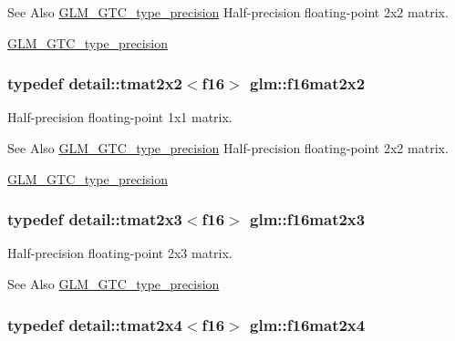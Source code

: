\begin{DoxySeeAlso}{See Also}
\hyperlink{group__gtc__type__precision}{G\-L\-M\-\_\-\-G\-T\-C\-\_\-type\-\_\-precision} Half-\/precision floating-\/point 2x2 matrix. 

\hyperlink{group__gtc__type__precision}{G\-L\-M\-\_\-\-G\-T\-C\-\_\-type\-\_\-precision} 
\end{DoxySeeAlso}
\hypertarget{group__gtc__type__precision_ga1f4b12c53051603b62e6fa69e3b7a98b}{
\subsubsection[{f16mat2x2}]{\setlength{\rightskip}{0pt plus 5cm}typedef detail\-::tmat2x2$<$f16$>$ {\bf glm\-::f16mat2x2}}}\label{group__gtc__type__precision_ga1f4b12c53051603b62e6fa69e3b7a98b}


Half-\/precision floating-\/point 1x1 matrix. 

\begin{DoxySeeAlso}{See Also}
\hyperlink{group__gtc__type__precision}{G\-L\-M\-\_\-\-G\-T\-C\-\_\-type\-\_\-precision} Half-\/precision floating-\/point 2x2 matrix. 

\hyperlink{group__gtc__type__precision}{G\-L\-M\-\_\-\-G\-T\-C\-\_\-type\-\_\-precision} 
\end{DoxySeeAlso}
\hypertarget{group__gtc__type__precision_ga8705b9a5a043c443df698f3274c7fc0e}{
\subsubsection[{f16mat2x3}]{\setlength{\rightskip}{0pt plus 5cm}typedef detail\-::tmat2x3$<$f16$>$ {\bf glm\-::f16mat2x3}}}\label{group__gtc__type__precision_ga8705b9a5a043c443df698f3274c7fc0e}


Half-\/precision floating-\/point 2x3 matrix. 

\begin{DoxySeeAlso}{See Also}
\hyperlink{group__gtc__type__precision}{G\-L\-M\-\_\-\-G\-T\-C\-\_\-type\-\_\-precision} 
\end{DoxySeeAlso}
\hypertarget{group__gtc__type__precision_ga0764ac8adf2ac8909c100f9ce21eecba}{
\subsubsection[{f16mat2x4}]{\setlength{\rightskip}{0pt plus 5cm}typedef detail\-::tmat2x4$<$f16$>$ {\bf glm\-::f16mat2x4}}}\label{group__gtc__type__precision_ga0764ac8adf2ac8909c100f9ce21eecba}


